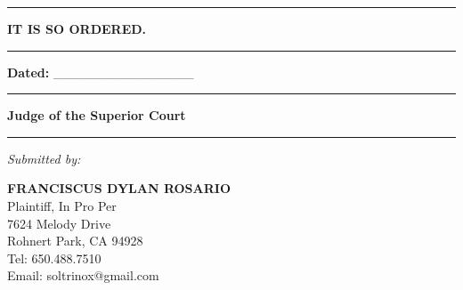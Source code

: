 \begin{center}\rule{0.5\linewidth}{0.5pt}\end{center}

\textbf{IT IS SO ORDERED.}

\begin{center}\rule{0.5\linewidth}{0.5pt}\end{center}

\textbf{Dated:} \_\_\_\_\_\_\_\_\_\_\_\_\_\_\_

\begin{center}\rule{0.5\linewidth}{0.5pt}\end{center}

\textbf{Judge of the Superior Court}

\begin{center}\rule{0.5\linewidth}{0.5pt}\end{center}

\emph{Submitted by:}

\textbf{FRANCISCUS DYLAN ROSARIO}\\
Plaintiff, In Pro Per\\
7624 Melody Drive\\
Rohnert Park, CA 94928\\
Tel: 650.488.7510\\
Email: soltrinox@gmail.com



